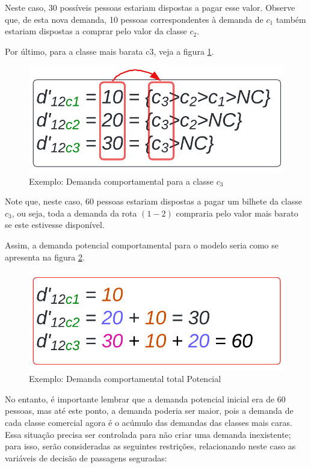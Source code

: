 Neste caso, 30 possíveis pessoas estariam dispostas a pagar esse valor. Observe que, de esta nova demanda, 10 pessoas correspondentes à demanda de $c_1$ também estariam dispostas a comprar pelo valor da classe $c_2$.

Por último, para a classe mais barata c3, veja a figura \ref{fig: exemplo_dem_c3}.
\begin{figure}[!ht]
	\begin{center}
		\includegraphics[scale=0.24]{img/dem_compo_c3.png}
		\caption{Exemplo: Demanda comportamental para a classe $c_3$}
		\label{fig: exemplo_dem_c3}
	\end{center}
\end{figure}
Note que, neste caso, 60 pessoas estariam dispostas a pagar um bilhete da classe $c_3$, ou seja, toda a demanda da rota $(1-2)$ compraria pelo valor mais barato se este estivesse disponível.

Assim, a demanda potencial comportamental para o modelo seria como se apresenta na figura \ref{fig: exemplo_dem_poten}.
\begin{figure}[!ht]
	\begin{center}
		\includegraphics[scale=0.24]{img/dem_compo_poten.png}
		\caption{Exemplo: Demanda comportamental total Potencial}
		\label{fig: exemplo_dem_poten}
	\end{center}
\end{figure}
No entanto, é importante lembrar que a demanda potencial inicial era de 60 pessoas, mas até este ponto, a demanda poderia ser maior, pois a demanda de cada classe comercial agora é o acúmulo das demandas das classes mais caras. Essa situação precisa ser controlada para não criar uma demanda inexistente; para isso, serão consideradas as seguintes restrições, relacionando neste caso as variáveis de decisão de passagens seguradas:


